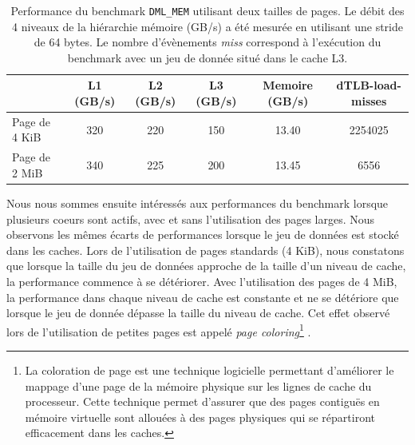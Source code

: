     \begin{table}
    \centering
    \begin{tabular}{l|c|c|c|c|c|}
    \cline{2-6}
     & \cellcolor[HTML]{EFEFEF}L1 (GB/s) & \cellcolor[HTML]{EFEFEF}L2 (GB/s) & \cellcolor[HTML]{EFEFEF}L3 (GB/s) & \cellcolor[HTML]{EFEFEF}Memoire (GB/s) & \cellcolor[HTML]{EFEFEF}dTLB-load-misses \\ \hline
    \multicolumn{1}{|l|}{\cellcolor[HTML]{EFEFEF}Page de 4 KiB} & 320 & 220 & 150 & 13.40 & 2254025 \\ \hline
    \multicolumn{1}{|l|}{\cellcolor[HTML]{EFEFEF}Page de 2 MiB} & 340 & 225 & 200 & 13.45 & 6556 \\ \hline
    \end{tabular}%
    \caption{Performance du benchmark \texttt{DML\_MEM} utilisant deux tailles de pages. Le débit des 4 niveaux de la hiérarchie mémoire (GB/s) a été mesurée en utilisant une stride de 64 bytes. Le nombre d'évènements \textit{miss} correspond à l'exécution du benchmark avec un jeu de donnée situé dans le cache L3.}
    \label{tab:large_page_memory}
    \end{table}
    
    
    Nous nous sommes ensuite intéressés aux performances du benchmark lorsque plusieurs coeurs sont actifs, avec et sans l'utilisation des pages larges. Nous observons les mêmes écarts de performances lorsque le jeu de données est stocké dans les caches. Lors de l'utilisation de pages standards (4 KiB), nous constatons que lorsque la taille du jeu de données approche de la taille d'un niveau de cache, la performance commence à se détériorer. Avec l'utilisation des pages de 4 MiB, la performance dans chaque niveau de cache est constante et ne se détériore que lorsque le jeu de donnée dépasse la taille du niveau de cache. Cet effet observé lors de l'utilisation de petites pages est appelé \textit{page coloring}\footnote{La coloration de page est une technique logicielle permettant d'améliorer le mappage d'une page de la mémoire physique sur les lignes de cache du processeur. Cette technique permet d'assurer que des pages contiguës en mémoire virtuelle sont allouées à des pages physiques qui se répartiront efficacement dans les caches.} \cite{Zhang2009}.
  
